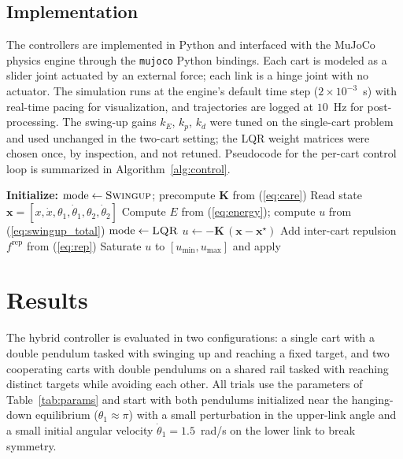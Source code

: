 \documentclass[conference]{IEEEtran}
\begin{document}
\subsection{Implementation}
The controllers are implemented in Python and interfaced with the MuJoCo physics engine \cite{todorov2012mujoco} through the \texttt{mujoco} Python bindings. Each cart is modeled as a slider joint actuated by an external force; each link is a hinge joint with no actuator. The simulation runs at the engine's default time step ($2\times10^{-3}$~s) with real-time pacing for visualization, and trajectories are logged at $10$~Hz for post-processing. The swing-up gains $k_E$, $k_p$, $k_d$ were tuned on the single-cart problem and used unchanged in the two-cart setting; the LQR weight matrices were chosen once, by inspection, and not retuned. Pseudocode for the per-cart control loop is summarized in Algorithm~\ref{alg:control}.

\begin{algorithm}[t]
\caption{Per-cart hybrid controller}
\label{alg:control}
\begin{algorithmic}[1]
\State \textbf{Initialize:} $\text{mode} \gets \textsc{Swingup}$; precompute $\mathbf{K}$ from (\ref{eq:care})
\Loop
    \State Read state $\mathbf{x}=[x,\dot x,\theta_1,\dot\theta_1,\theta_2,\dot\theta_2]$
        \State Compute $E$ from (\ref{eq:energy}); compute $u$ from (\ref{eq:swingup_total})
            \State $\text{mode} \gets \textsc{LQR}$
        \EndIf
    \Else
        \State $u \gets -\mathbf{K}\,(\mathbf{x}-\mathbf{x}^\star)$
    \EndIf
    \State Add inter-cart repulsion $f^{\text{rep}}$ from (\ref{eq:rep})
    \State Saturate $u$ to $[u_{\min},u_{\max}]$ and apply
\EndLoop
\end{algorithmic}
\end{algorithm}

\section{Results}\label{sec:results}

The hybrid controller is evaluated in two configurations: a single cart with a double pendulum tasked with swinging up and reaching a fixed target, and two cooperating carts with double pendulums on a shared rail tasked with reaching distinct targets while avoiding each other. All trials use the parameters of Table~\ref{tab:params} and start with both pendulums initialized near the hanging-down equilibrium ($\theta_1\approx\pi$) with a small perturbation in the upper-link angle and a small initial angular velocity $\dot\theta_1=1.5$~rad/s on the lower link to break symmetry.
\end{document}
